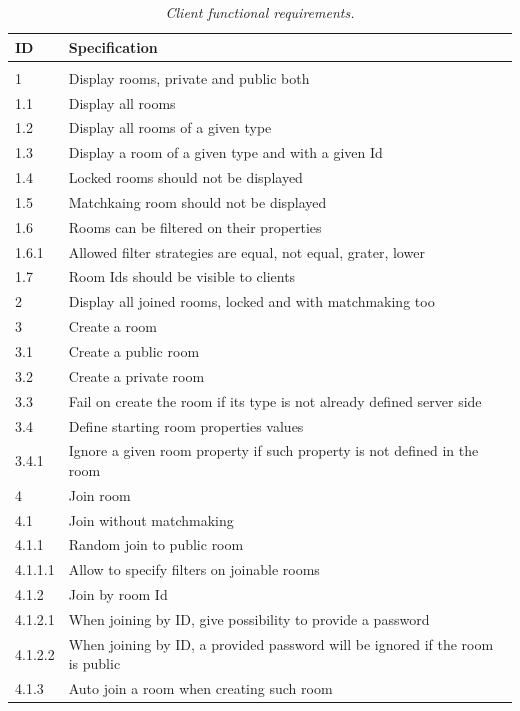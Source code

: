 \begin{center}
  \begin{longtable}{|l|l|} 
    \caption{\textit{Client functional requirements.}} \label{table:client-f-req} \\
 
\hline
ID   &  Specification \\
\hline
\multicolumn{2}{|c|}{} \\
\hline
1       & Display rooms, private and public both \\
1.1     & Display all rooms \\
1.2     & Display all rooms of a given type \\
1.3     & Display a room of a given type and with a given Id \\ 
1.4     & Locked rooms should not be displayed \\
1.5     & Matchkaing room should not be displayed \\
1.6     & Rooms can be filtered on their properties \\
1.6.1   & Allowed filter strategies are equal, not equal, grater, lower \\
1.7     & Room Ids should be visible to clients \\
2       & Display all joined rooms, locked and with matchmaking too \\
3       & Create a room \\
3.1     & Create a public room \\
3.2     & Create a private room \\
3.3     & Fail on  create the room if its type is not already defined server side \\
3.4     & Define starting room properties values \\
3.4.1   & Ignore a given room property if such property is not defined in the room \\
4       & Join room \\
4.1     & Join without matchmaking \\
4.1.1   & Random join to public room \\
4.1.1.1 & Allow to specify filters on joinable rooms \\
4.1.2   & Join by room Id \\
4.1.2.1 & When joining by ID, give possibility to provide a password \\
4.1.2.2 & When joining by ID, a provided password will be ignored if the room is public \\
4.1.3   & Auto join a room when creating such room \\

\end{longtable}
\end{center}
